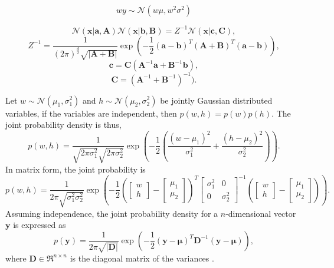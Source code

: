 \documentclass[ %
author={Dillon Keith Diep},
supervisor={Dr. Carl Henrik Ek},
degree={MEng},
title={ART-CG Hair:},
subtitle={Assisted Real-time Content Generation of Stylised Virtual Hair},
type={Research},
year={2017} ]{dissertation}
\begin{document}
\begin{equation} \label{gd:scale}
wy\sim\mathcal{N}(w\mu,w^2\sigma^2)
\end{equation}

\begin{equation} \label{gd:prod}
\mathcal{N}(\bm{x}|\bm{a},\bm{A})\mathcal{N}(\bm{x}|\bm{b},\bm{B}) = Z^{-1}\mathcal{N}(\bm{x}|\bm{c}, \bm{C}),
\end{equation}
$$Z^{-1}=
\frac{1}{(2\pi)^\frac{d}{2}\sqrt{|\bm{A}+\bm{B}|}}
\exp\left(-\frac{1}{2}(\bm{a}-\bm{b})^T(\bm{A}+\bm{B})^T(\bm{a}-\bm{b})\right),$$
$$\bm{c}=\bm{C}(\bm{A}^{-1}\bm{a}+\bm{B}^{-1}\bm{b}),$$
$$\bm{C} = (\bm{A}^{-1}+\bm{B}^{-1})^{-1}).$$

Let $w\sim\mathcal{N}(\mu_1, \sigma^2_1)$ and $h\sim\mathcal{N}(\mu_2, \sigma^2_2)$ be jointly Gaussian distributed variables, if the variables are independent, then $p(w,h)=p(w)p(h)$.
The joint probability density is thus,
$$p(w,h)=\frac{1}{\sqrt{2\pi\sigma^2_1}\sqrt{2\pi\sigma^2_2}}
\exp\left(-\frac{1}{2}\left(\frac{(w-\mu_1)^2}{\sigma^2_1}+\frac{(h-\mu_2)^2}{\sigma^2_2}\right)\right).$$
In matrix form, the joint probability is
$$p(w,h)=\frac{1}{2\pi\sqrt{\sigma^2_1\sigma^2_2}}\exp
\left(
-\frac{1}{2}
\left(
\left[
\begin{matrix}
w \\
h
\end{matrix}
\right]
-
\left[
\begin{matrix}
\mu_1 \\
\mu_2
\end{matrix}
\right]
\right)^T
\left[
\begin{matrix}
\sigma^2_1  &   0\\
0           &   \sigma^2_2
\end{matrix}
\right]^{-1}
\left(
\left[
\begin{matrix}
w \\
h
\end{matrix}
\right]
-
\left[
\begin{matrix}
\mu_1 \\
\mu_2
\end{matrix}
\right]
\right)
\right).$$
Assuming independence, the joint probability density for a $n$-dimensional vector $\bm{y}$ is expressed as
\begin{equation} \label{jointpd}
p(\bm{y})=\frac{1}{2\pi\sqrt{|\bm{D}|}}\exp\left(-\frac{1}{2}(\bm{y}-\bm{\mu})^T\bm{D}^{-1}(\bm{y}-\bm{\mu})\right),
\end{equation}
where $\bm{D}\in\Re^{n \times n}$ is the diagonal matrix of the variances \cite[p.78]{bishop}.
\end{document}
